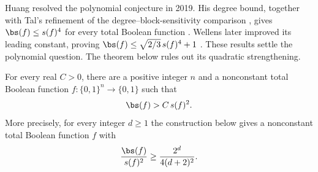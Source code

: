 Huang resolved the polynomial conjecture in 2019. His degree bound,
together with Tal's refinement of the degree--block-sensitivity comparison
\cite{Tal2013}, gives \(\bs(f)\le s(f)^4\) for every total Boolean function
\cite[Theorem~1.5]{Huang2019}. Wellens later improved its leading constant,
proving
\(\bs(f)\le\sqrt{2/3}\,s(f)^4+1\)
\cite[Corollary~4.2]{Wellens2022}.
These results settle the polynomial question. The theorem below rules out
its quadratic strengthening.

\begin{theorem}\label{thm:main}
For every real \(C>0\), there are a positive integer \(n\) and a
nonconstant total Boolean function \(f:\{0,1\}^n\to\{0,1\}\) such that
\[
 \bs(f)>C\,s(f)^2.
\]
More precisely, for every integer \(d\ge1\) the construction below gives
a nonconstant total Boolean function \(f\) with
\[
 \frac{\bs(f)}{s(f)^2}\ge \frac{2^d}{4(d+2)^2}.
\]
\end{theorem}
